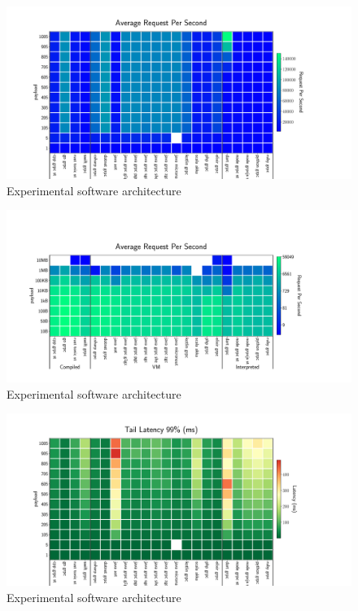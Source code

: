 \begin{figure}[!hbt]
    \begin{center}
        \includegraphics[width=1.2\linewidth]{imgs/rps_clients}
    \end{center}
    \caption{Experimental software architecture}\label{fig:rps_clients}
\end{figure}

\begin{figure}[!hbt]
    \begin{center}
        \includegraphics[width=1.2\linewidth]{imgs/rps_payload}
    \end{center}
    \caption{Experimental software architecture}\label{fig:rps_payload}
\end{figure}



\begin{figure}[!hbt]
    \begin{center}
        \includegraphics[width=1.2\linewidth]{imgs/tail99_clients}
    \end{center}
    \caption{Experimental software architecture}\label{fig:tail99_clients}
\end{figure}


